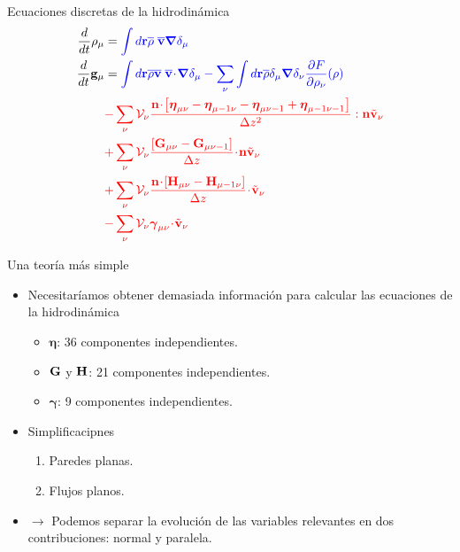 \documentclass{beamer}
\newcommand{\esc}{\!\cdot\!}
\newcommand{\llg}{\left\lgroup}
\newcommand{\rlg}{\right\rgroup}
\begin{document}
\begin{frame}{Ecuaciones discretas de la hidrodinámica}
\begin{align}
  \frac{d}{dt}\rho_\mu&=  {\color{blue} \int d{\bf r}\overline{\rho} \; \overline{\bf v}\boldsymbol{\nabla}\delta_\mu }
\nonumber\\
\frac{d}{dt}{\bf g}_\mu&=
  {\color{blue} \int d{\bf r}\overline{\rho} \overline{\bf v}\;\overline{\bf v}\esc\boldsymbol{\nabla}\delta_{\mu}
  -\sum_\nu\int d{\bf r}\overline{\rho}\delta_{\mu}\boldsymbol{\nabla}\delta_{\nu}
\frac{\partial  F}{\partial \rho_{\nu}}(\rho)}
\nonumber\\
&{\color{red}-\sum_{\nu}{\cal V}_\nu \frac{{\bf n}\esc\left[\boldsymbol{\eta}_{\mu\nu}-\boldsymbol{\eta}_{\mu-1\nu}-\boldsymbol{\eta}_{\mu\nu-1}+\boldsymbol{\eta}_{\mu-1\nu-1}\right]}{\Delta z^2}:{\bf n}\tilde{\bf v}_\nu}
\nonumber\\
&{\color{red}+\sum_{\nu}{\cal V}_\nu\frac{\left[{\bf G}_{\mu\nu}-{\bf G}_{\mu\nu-1}\right]}{\Delta z}\esc{\bf n}\tilde{\bf v}_\nu}
\nonumber\\
&{\color{red}+\sum_{\nu}{\cal V}_\nu\frac{{\bf n}\esc\left[{\bf H}_{\mu\nu}-{\bf H}_{\mu-1\nu}\right]}{\Delta z}\esc\tilde{\bf v}_\nu}
\nonumber\\
&{\color{red}-\sum_{\nu}{\cal V}_\nu\boldsymbol{\gamma}_{\mu\nu}\esc\tilde{\bf v}_\nu}
\nonumber
\end{align}
\end{frame}

\begin{frame}{Una teoría más simple}
  \begin{itemize}
    \item<1-> Necesitaríamos obtener demasiada información para calcular las ecuaciones de la hidrodinámica 
      \begin{itemize}
        \item $\boldsymbol{\eta}$: 36 componentes independientes.
        \item ${\bf G}$ y ${\bf H}$: 21 componentes independientes. 
        \item $\boldsymbol{\gamma}$: 9 componentes independientes.  
      \end{itemize}
    \item<2-> Simplificacipnes 
      \begin{enumerate}
        \item Paredes planas. 
        \item Flujos planos. 
      \end{enumerate}
    \item<3-> $\rightarrow$ Podemos separar la evolución de las variables relevantes en dos contribuciones: normal y paralela. 
    \end{itemize}
\end{frame}
\end{document}
